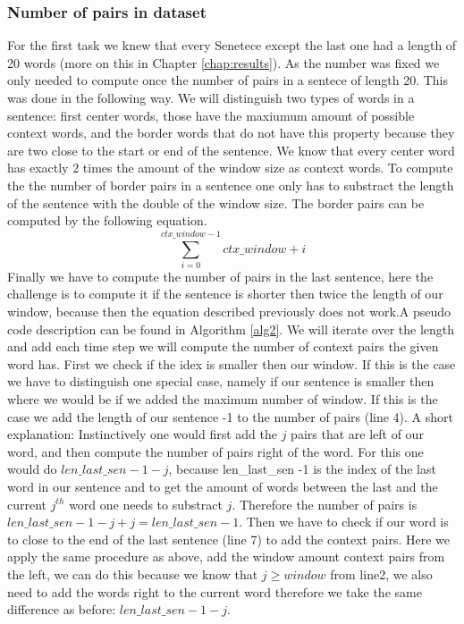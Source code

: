 \subsubsection{Number of pairs in dataset}
For the first task we knew that every Senetece except the last one had a length of 20 words (more on this in Chapter \ref{chap:results}). As the number was fixed we only needed to compute once the number of pairs in a sentece of length 20. This was done in the following way. We will distinguish two types of words in a sentence: first center words, those have the maxiumum amount of possible context words, and the border words that do not have this property because they are two close to the start or end of the sentence.
We know that every center word has exactly 2 times the amount of the window size as context words. To compute the the number of border pairs in a sentence one only has to substract the length of the sentence with the double of the window size. The border pairs can be computed by the following equation. 
\begin{equation}
\sum_{i=0}^{ctx\_window -1} ctx\_window + i
\end{equation}
Finally we have to compute the number of pairs in the last sentence, here the challenge is to compute it if the sentence is shorter then twice the length of our window, because then the equation described previously does not work.A pseudo code description can be found in Algorithm \ref{alg2}. We will iterate over the length and add each time step we will compute the number of context pairs the given word has. First we check if the idex is smaller then our window. If this is the case we have to distinguish one special case, namely if our sentence is smaller then where we would be if we added the maximum number of window. If this is the case we add the length of our sentence -1 to the number of pairs (line 4). A short explanation: Instinctively one would first add the $j$ pairs that are left of our word, and then compute the number of pairs right of the word. For this one would do $len\_last\_sen -1 -j$, because len\_last\_sen -1  is the index of the last word in our sentence and to get the amount of words between the  last and the current $j^{th}$ word one needs to substract $j$. Therefore the number of pairs is $len\_last\_sen -1 -j + j = len\_last\_sen -1$.  Then we have to check if our word is to close to the end of the last sentence (line 7) to add the context pairs. Here we apply the same procedure as above, add the window amount context pairs from the left, we can do this because we know that $j \geq window$ from line2, we also need to add the words right to the current word therefore we take the same difference as before: $len\_last\_sen -1 -j$.
